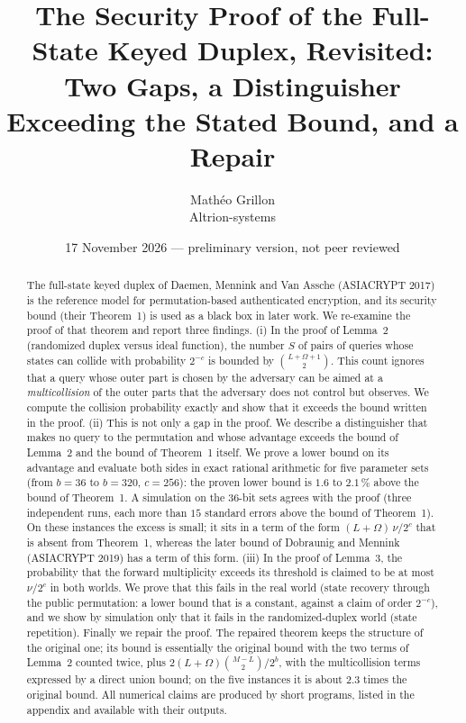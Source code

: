 \documentclass[11pt,a4paper]{article}
\title{The Security Proof of the Full-State Keyed Duplex, Revisited:\\
Two Gaps, a Distinguisher Exceeding the Stated Bound, and a Repair}
\author{Math\'eo Grillon\\[2pt] \normalsize Altrion-systems}
\date{17 November 2026 --- preliminary version, not peer reviewed}
\theoremstyle{definition}
\theoremstyle{remark}
\begin{document}
\maketitle

\begin{abstract}
The full-state keyed duplex of Daemen, Mennink and Van Assche (ASIACRYPT 2017) is the reference model for
permutation-based authenticated encryption, and its security bound (their Theorem~1) is used as a black box in
later work. We re-examine the proof of that theorem and report three findings.
(i) In the proof of Lemma~2 (randomized duplex versus ideal function), the number $S$ of pairs of queries whose
states can collide with probability $2^{-c}$ is bounded by $\binom{L+\Omega+1}{2}$. This count ignores that a query
whose outer part is chosen by the adversary can be aimed at a \emph{multicollision} of the outer parts that the
adversary does not control but observes. We compute the collision probability exactly and show that it exceeds the
bound written in the proof.
(ii) This is not only a gap in the proof. We describe a distinguisher that makes no query to the permutation and
whose advantage exceeds the bound of Lemma~2 and the bound of Theorem~1 itself. We prove a lower bound on its
advantage and evaluate both sides in exact rational arithmetic for five parameter sets (from $b=36$ to $b=320$,
$c=256$): the proven lower bound is $1.6$ to $2.1\,\%$ above the bound of Theorem~1. A simulation on the $36$-bit
sets agrees with the proof (three independent runs, each more than $15$ standard errors above the bound of
Theorem~1). On these instances the excess is small; it sits in a term of the form $(L+\Omega)\,\nu/2^c$ that is absent
from Theorem~1, whereas the later bound of Dobraunig and Mennink (ASIACRYPT 2019) has a term of this form.
(iii) In the proof of Lemma~3, the probability that the forward multiplicity exceeds its threshold is claimed to be at
most $\nu/2^c$ in both worlds. We prove that this fails in the real world (state recovery through the public
permutation: a lower bound that is a constant, against a claim of order $2^{-c}$), and we show by simulation only that
it fails in the randomized-duplex world (state repetition).
Finally we repair the proof. The repaired theorem keeps the structure of the original one; its bound is essentially
the original bound with the two terms of Lemma~2 counted twice, plus $2(L+\Omega)\binom{M-L}{2}/2^b$, with the
multicollision terms expressed by a direct union bound; on the five instances it is about $2.3$ times the original
bound. All numerical claims are produced by short programs, listed in the appendix and available with their outputs.
\end{abstract}
\end{document}
